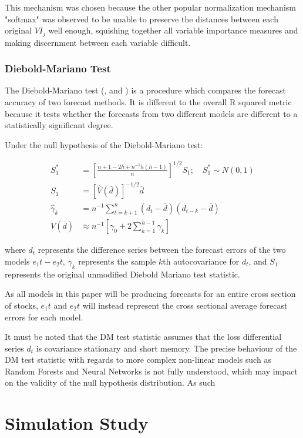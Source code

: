 \documentclass[a4paper, table]{article}
\begin{document}
This mechanism was chosen because the other popular normalization mechanism "softmax" was observed to be unable to preserve the distances between each original $VI_j$ well enough, squishing together all variable importance measures and making discernment between each variable difficult.

\subsubsection{Diebold-Mariano Test}

The Diebold-Mariano test (\cite{diebold_comparing_2002}, and \cite{harvey_testing_1997}) is a procedure which compares the forecast accuracy of two forecast methods. It is different to the overall R squared metric because it tests whether the forecasts from two different models are different to a statistically significant degree. 

Under the null hypothesis of the Diebold-Mariano test:

\begin{align}
S_1^* &= \left[ 
\frac{n + 1 - 2h + n^{-1}h(h-1)}
{n} 
\right]^{1/2}S_1 ; \quad S_1^* \sim N(0,1) \\
S_1 &= \left[ 
\hat{V}(\bar{d})
\right] ^{-1/2}\bar{d} \\
\hat{\gamma}_k &= n^{-1} \sum_{t = k + 1}^{n}(d_t - \bar{d})(d_{t-k} - \bar{d}) \\
V(\bar{d}) &\approx n^{-1}\left[ 
\gamma_0 + 2 \sum_{k = 1}^{h - 1}\gamma_k
\right] 
\end{align}

where $d_t$ represents the difference series between the forecast errors of the two models $e_1t - e_2t$, $\hat{\gamma}_k$ represents the sample $k$th autocovariance for $d_t$, and $S_1$ represents the original unmodified Diebold Mariano test statistic.

As all models in this paper will be producing forecasts for an entire cross section of stocks, $e_1t$ and $e_2t$ will instead represent the cross sectional average forecast errors for each model.

It must be noted that the DM test statistic assumes that the loss differential series $d_t$ is covariance stationary and short memory. The precise behaviour of the DM test statistic with regards to more complex non-linear models such as Random Forests and Neural Networks is not fully understood, which may impact on the validity of the null hypothesis distribution. As such 

\section{Simulation Study}
\end{document}
